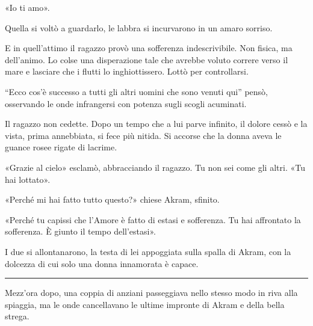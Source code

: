 \documentclass[a4paper,10pt]{memoir}
\begin{document}
«Io ti amo».

Quella si voltò a guardarlo, le labbra si incurvarono in un amaro sorriso.

E in quell'attimo il ragazzo provò una sofferenza indescrivibile. Non fisica, ma
dell'animo. Lo colse una disperazione tale che avrebbe voluto correre verso il
mare e lasciare che i flutti lo inghiottissero. Lottò per controllarsi.

``Ecco cos'è successo a tutti gli altri uomini che sono venuti qui'' pensò,
osservando le onde infrangersi con potenza sugli scogli acuminati.

Il ragazzo non cedette. Dopo un tempo che a lui parve infinito, il dolore cessò
e la vista, prima annebbiata, si fece più nitida. Si accorse che la donna aveva
le guance rosee rigate di lacrime.

«Grazie al cielo» esclamò, abbracciando il ragazzo. Tu non sei come gli altri.
«Tu hai lottato».

«Perché mi hai fatto tutto questo?» chiese Akram, sfinito.

«Perché tu capissi che l'Amore è fatto di estasi e sofferenza. Tu hai affrontato
la sofferenza. È giunto il tempo dell'estasi».

I due si allontanarono, la testa di lei appoggiata sulla spalla di Akram, con la
dolcezza di cui solo una donna innamorata è capace.

\plainbreak{1}

Mezz'ora dopo, una coppia di anziani passeggiava nello stesso modo in riva alla
spiaggia, ma le onde cancellavano le ultime impronte di Akram e della bella
strega.
\end{document}
